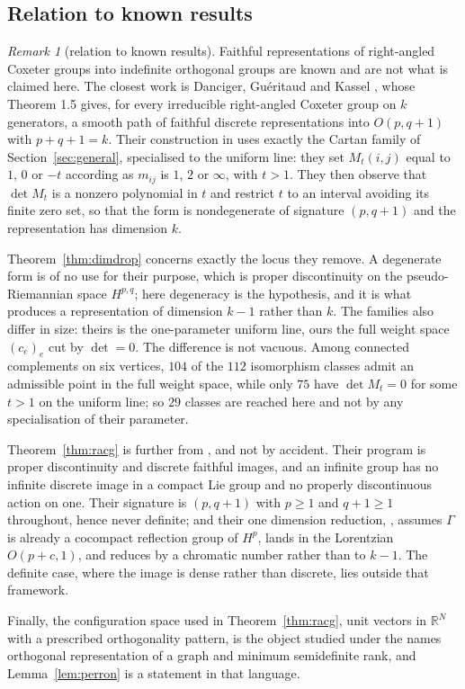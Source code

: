\documentclass[11pt]{article}
\theoremstyle{definition}
\theoremstyle{remark}
\newtheorem{remark}[theorem]{Remark}
\theoremstyle{definition}
\begin{document}
\subsection{Relation to known results}\label{sec:known}

\begin{remark}[relation to known results]\label{rem:known}
Faithful representations of right-angled Coxeter groups into indefinite orthogonal groups are known
and are not what is claimed here. The closest work is Danciger, Gu\'eritaud and Kassel \cite{DGK},
whose Theorem 1.5 gives, for every irreducible right-angled Coxeter group on $k$ generators, a
smooth path of faithful discrete representations into $O(p,q+1)$ with $p+q+1=k$. Their construction
in \cite[\S7.1]{DGK} uses exactly the Cartan family of Section~\ref{sec:general}, specialised to
the uniform line: they set $M_t(i,j)$ equal to $1$, $0$ or $-t$ according as $m_{ij}$ is $1$, $2$
or $\infty$, with $t>1$. They then observe that $\det M_t$ is a nonzero polynomial in $t$ and
restrict $t$ to an interval avoiding its finite zero set, so that the form is nondegenerate of
signature $(p,q+1)$ and the representation has dimension $k$.

Theorem~\ref{thm:dimdrop} concerns exactly the locus they remove. A degenerate form is of no use
for their purpose, which is proper discontinuity on the pseudo-Riemannian space $H^{p,q}$; here
degeneracy is the hypothesis, and it is what produces a representation of dimension $k-1$ rather
than $k$. The families also differ in size: theirs is the one-parameter uniform line, ours the full
weight space $(c_e)_{e}$ cut by $\det=0$. The difference is not vacuous. Among connected
complements on six vertices, $104$ of the $112$ isomorphism classes admit an admissible point in
the full weight space, while only $75$ have $\det M_t=0$ for some $t>1$ on the uniform line; so
$29$ classes are reached here and not by any specialisation of their parameter.

Theorem~\ref{thm:racg} is further from \cite{DGK}, and not by accident. Their program is proper
discontinuity and discrete faithful images, and an infinite group has no infinite discrete image in
a compact Lie group and no properly discontinuous action on one. Their signature is
$(p,q+1)$ with $p\ge1$ and $q+1\ge1$ throughout, hence never definite; and their one dimension
reduction, \cite[Prop.~5.1]{DGK}, assumes $\Gamma$ is already a cocompact reflection group of
$H^p$, lands in the Lorentzian $O(p+c,1)$, and reduces by a chromatic number rather than to
$k-1$. The definite case, where the image is dense rather than discrete, lies outside that
framework.

Finally, the configuration space used in Theorem~\ref{thm:racg}, unit vectors in $\mathbb{R}^{N}$
with a prescribed orthogonality pattern, is the object studied under the names orthogonal
representation of a graph and minimum semidefinite rank, and Lemma~\ref{lem:perron} is a statement
in that language.
\end{remark}
\end{document}
